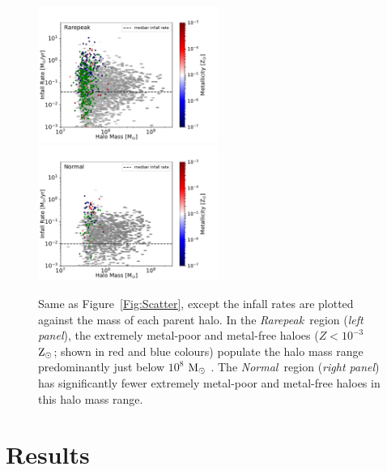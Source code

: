 \documentclass[graphics, twocolumn, usenatbib]{mn2e}
\newcommand{\msolar} {$\rm{M_{\odot}}~$}
\newcommand{\zsolarc} {$\rm{Z_{\odot}}$}
\newcommand{\rarepeak} {\textit{Rarepeak~}}
\newcommand{\normal} {\textit{Normal~}}
\newcommand{\void} {\textit{Void~}}
\begin{document}
\begin{figure}
\centering
\begin{minipage}{175mm}      \begin{center} 
\centerline{
\includegraphics[width=0.525\textwidth]{FIGURES/Rarepeak_MdotMHaloZ_Hexbin.pdf}
\includegraphics[width=0.525\textwidth]{FIGURES/Normal_MdotMHaloZ_Hexbin.pdf}}
\caption{Same as Figure~\ref{Fig:Scatter}, except
the infall rates are plotted against the mass of each parent halo.
In the \rarepeak region (\textit{left panel}), the extremely metal-poor
  and metal-free haloes ($Z < 10^{-3}$ \zsolarc; shown in red and blue colours) populate the halo mass range predominantly just below $10^{8}$
  \msolar.  The \normal region (\textit{right panel})
 has significantly fewer extremely metal-poor and metal-free haloes in this halo mass range.}
\label{Fig:HaloMass}
\end{center} \end{minipage}

\end{figure}


\section{Results} \label{Sec:Results}
\end{document}
